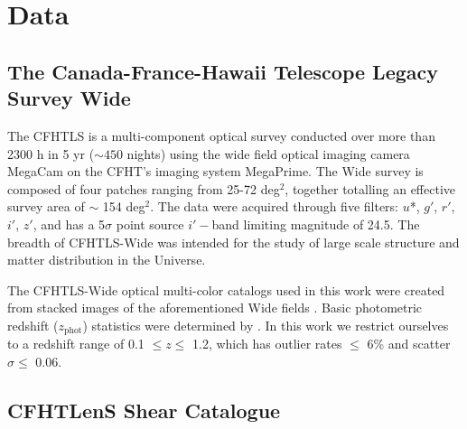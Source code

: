 
\section{Data}
\label{data}


\subsection{The Canada-France-Hawaii Telescope Legacy Survey Wide}

The \acf{CFHTLS} is a multi-component optical survey conducted over more than 2300 h in 5 yr ($\sim450$ nights) using the wide field optical imaging camera MegaCam on the \ac{CFHT}'s imaging system MegaPrime. The Wide survey is composed of four patches ranging from 25-72 deg$^2$, together totalling an effective survey area of $\sim$ 154 deg$^2$. The data were acquired through five filters: $u$*, $g'$, $r'$, $i'$, $z'$, and has a 5$\sigma$ point source $i'-$band limiting magnitude of 24.5. The breadth of \ac{CFHTLS}-Wide was intended for the study of large scale structure and matter distribution in the Universe.

The \ac{CFHTLS}-Wide optical multi-color catalogs used in this work were created from stacked images of the aforementioned Wide fields \citep[see][for details on the data processing and multi-color catalog creation]{Erben09, Hildebrandt09a, Hildebrandt12, Erben13}. Basic photometric redshift ($z_{\mathrm{phot}}$) statistics were determined by \citet{Hildebrandt12}. In this work we restrict ourselves to a redshift range of 0.1 $\leq z \leq$ 1.2, which has outlier rates $\leq$ 6\% and scatter $\sigma \leq$ 0.06.


\subsection{\ac{CFHTLenS} Shear Catalogue}

